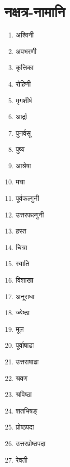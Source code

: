 \section{नक्षत्र-नामानि}
\label{app:nakshatra_names}
\begin{multicols}{2}
\begin{enumerate}
\item अश्विनी
\item अपभरणी
\item कृत्तिका
\item रोहिणी
\item मृगशीर्ष
\item आर्द्रा
\item पुनर्वसू
\item पुष्य
\item आश्रेषा
\item मघा
\item पूर्वफल्गुनी
\item उत्तरफल्गुनी
\item हस्त
\item चित्रा
\item स्वाति
\item विशाखा
\item अनूराधा
\item ज्येष्ठा
\item मूल
\item पूर्वाषाढा
\item उत्तराषाढा
\item श्रवण
\item श्रविष्ठा
\item शतभिषङ्
\item प्रोष्ठपदा
\item उत्तरप्रोष्ठपदा
\item रेवती
\end{enumerate}
\end{multicols}